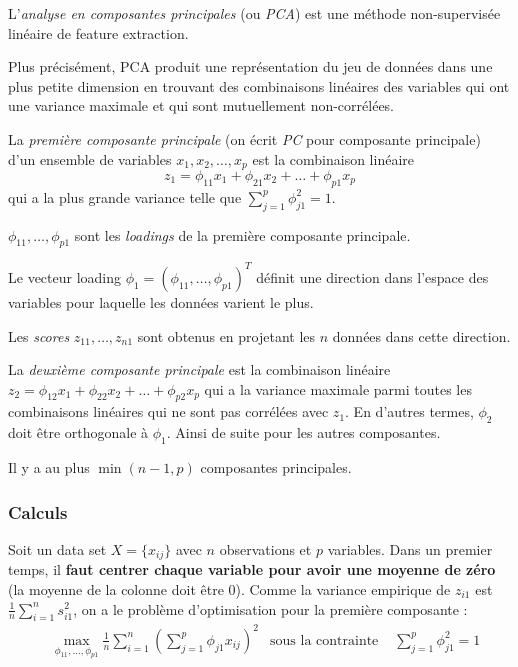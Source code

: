         \begin{definition}
            L'\textit{analyse en composantes principales} (ou \textit{PCA}) est une méthode non-supervisée linéaire de feature extraction.

            Plus précisément, PCA produit une représentation du jeu de données dans une plus petite dimension en trouvant des combinaisons linéaires des variables qui ont une variance maximale et qui sont mutuellement non-corrélées.
        \end{definition}

        \begin{definition}
            La \textit{première composante principale} (on écrit \textit{PC} pour composante principale) d'un ensemble de variables \(x_1, x_2, \dots, x_p\) est la combinaison linéaire
            \[
                z_1 = \phi_{11}x_1 + \phi_{21} x_2 + \dots + \phi_{p1} x_p
            \]
            qui a la plus grande variance telle que \(\sum_{j=1}^p \phi_{j1}^2 = 1\).

            \(\phi_{11}, \dots, \phi_{p1}\) sont les \textit{loadings} de la première composante principale.

            Le vecteur loading \(\phi_1 = (\phi_{11}, \dots, \phi_{p1})^T\) définit une direction dans l'espace des variables pour laquelle les données varient le plus.

            Les \textit{scores} \(z_{11}, \dots, z_{n1}\) sont obtenus en projetant les \(n\) données dans cette direction.

            La \textit{deuxième composante principale} est la combinaison linéaire \(z_{2} = \phi_{12}x_1 + \phi_{22}x_2 + \dots + \phi_{p2}x_p\) qui a la variance maximale parmi toutes les combinaisons linéaires qui ne sont pas corrélées avec \(z_1\). En d'autres termes, \(\phi_2\) doit être orthogonale à \(\phi_1\). Ainsi de suite pour les autres composantes.

            Il y a au plus \(\min(n - 1, p)\) composantes principales.
        \end{definition}

        \subsubsection{Calculs}
            Soit un data set \(X = \{x_{ij}\}\) avec \(n\) observations et \(p\) variables. Dans un premier temps, il \textbf{faut centrer chaque variable pour avoir une moyenne de zéro} (la moyenne de la colonne doit être 0). Comme la variance empirique de \(z_{i1}\) est \(\frac{1}{n} \sum_{i=1}^n s_{i1}^2\), on a le problème d'optimisation pour la première composante :
            \begin{align*}
                &\max_{\phi_{11}, \dots, \phi_{p1}} \frac{1}{n} \sum_{i=1}^n \left(\sum_{j=1}^p \phi_{j1} x_{ij}\right)^2 & \text{sous la contrainte } &\sum_{j=1}^p \phi_{j1}^2 = 1
            \end{align*}

